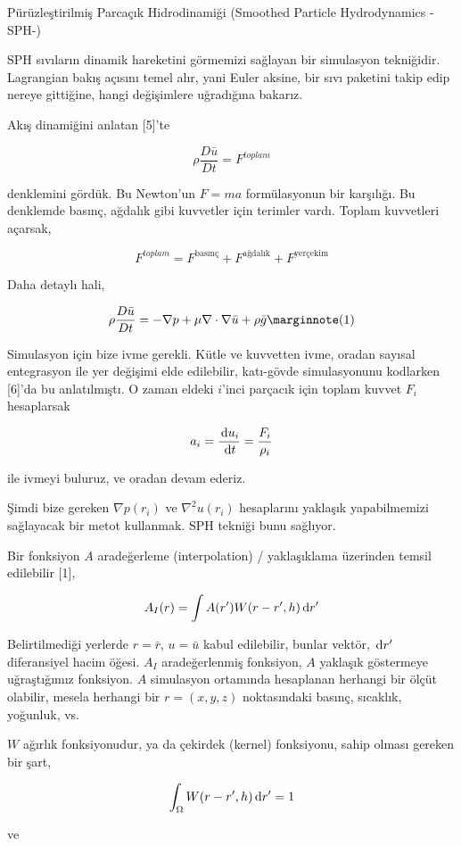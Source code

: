\documentclass[12pt,fleqn]{article}\usepackage{../../common}
\begin{document}
Pürüzleştirilmiş Parcaçık Hidrodinamiği (Smoothed Particle Hydrodynamics -SPH-)

SPH sıvıların dinamik hareketini görmemizi sağlayan bir simulasyon
tekniğidir. Lagrangian bakış açısını temel alır, yani Euler aksine, bir sıvı
paketini takip edip nereye gittiğine, hangi değişimlere uğradığına
bakarız.

Akış dinamiğini anlatan [5]'te

$$
\rho \frac{D \bar{u}}{D t} = F^{toplam} 
$$

denklemini gördük. Bu Newton'un $F=ma$ formülasyonun bir karşılığı. Bu denklemde
basınç, ağdalık gibi kuvvetler için terimler vardı. Toplam kuvvetleri açarsak,

$$
F^{toplam}  = F^{\textrm{basınç}} + F^{\textrm{ağdalık}} + F^{\textrm{yerçekim}} 
$$

Daha detaylı hali,

$$
\rho \frac{D \bar{u}}{D t} = 
- \nabla p + \mu \nabla \cdot \nabla \bar{u} + \rho \bar{g}
\mlabel{1}
$$

Simulasyon için bize ivme gerekli. Kütle ve kuvvetten ivme, oradan sayısal
entegrasyon ile yer değişimi elde edilebilir, katı-gövde simulasyonunu kodlarken
[6]'da bu anlatılmıştı. O zaman eldeki $i$'inci parçacık için toplam kuvvet
$F_i$ hesaplarsak

$$
a_i = \frac{\,\mathrm{d} u_i}{\,\mathrm{d} t} = \frac{F_i}{\rho_i}
$$

ile ivmeyi buluruz, ve oradan devam ederiz.

Şimdi bize gereken $\nabla p(r_i)$ ve $\nabla^2 u(r_i)$ hesaplarını yaklaşık
yapabilmemizi sağlayacak bir metot kullanmak. SPH tekniği bunu sağlıyor.

Bir fonksiyon $A$ aradeğerleme (interpolation) / yaklaşıklama üzerinden temsil
edilebilir [1],

$$
A_I(r) = \int A(r') W(r-r',h) \,\mathrm{d} r'
$$

Belirtilmediği yerlerde $r = \bar{r}$, $u = \bar{u}$ kabul edilebilir, bunlar
vektör, $\,\mathrm{d} r'$ diferansiyel hacim öğesi. $A_I$ aradeğerlenmiş fonksiyon, $A$
yaklaşık göstermeye uğraştığımız fonksiyon. $A$ simulasyon ortamında hesaplanan
herhangi bir ölçüt olabilir, mesela herhangi bir $r=(x,y,z)$ noktasındaki
basınç, sıcaklık, yoğunluk, vs.

$W$ ağırlık fonksiyonudur, ya da çekirdek (kernel) fonksiyonu, sahip olması
gereken bir şart,

$$
\int_\Omega  W(r-r',h) \,\mathrm{d} r' = 1
$$

ve
\end{document}
